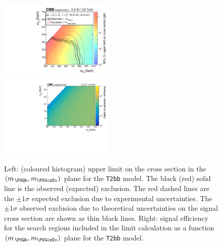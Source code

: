 \clearpage
\begin{figure}[!h]
  \begin{center}
    \includegraphics[width=0.49\textwidth]{Supplementary/RA1T2bbXSEC_aux} \, 
    \includegraphics[width=0.49\textwidth]{Supplementary/T2bb_merging_4_cats_aux} \,     
  \end{center}
  \caption{Left: (coloured histogram) upper limit on the cross section in the $(m_{\,\PSQb}, m_{\PSGczDo})$ plane for the \texttt{T2bb} model. 
  The black (red) solid line is the observed (expected) exclusion. The red dashed lines are the $\pm1\sigma$ expected exclusion due to experimental uncertainties. 
  The $\pm1\sigma$ observed exclusion due to theoretical uncertainties on the signal cross section are shown as thin black lines. 
  Right: signal efficiency for the search regions included in the limit calculation as a function $(m_{\,\PSQb}, m_{\PSGczDo})$ plane for the \texttt{T2bb} model. 
  \label{fig:T2bb_excl}}
\end{figure}




